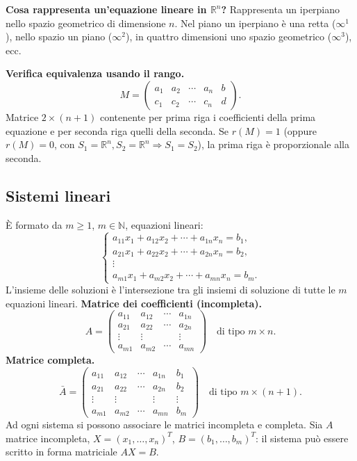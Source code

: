 \documentclass[11pt,a4paper]{article}
\newcommand{\pagina}[1]{\clearpage}
\begin{document}
\textbf{Cosa rappresenta un'equazione lineare in $\mathbb R^n$?} Rappresenta un iperpiano nello spazio geometrico
\pagina{23}
di dimensione $n$. Nel piano un iperpiano è una retta ($\infty^1$), nello spazio un piano ($\infty^2$), in quattro dimensioni uno spazio geometrico ($\infty^3$), ecc.

\textbf{Verifica equivalenza usando il rango.}
\[M=\begin{pmatrix}a_1&a_2&\cdots&a_n&b\\c_1&c_2&\cdots&c_n&d\end{pmatrix}.\]
Matrice $2\times(n+1)$ contenente per prima riga i coefficienti della prima equazione e per seconda riga quelli della seconda. Se $r(M)=1$ (oppure $r(M)=0$, con $S_1=\mathbb R^n,S_2=\mathbb R^n\Longrightarrow S_1=S_2$), la prima riga è proporzionale alla seconda.
\subsection*{Sistemi lineari}
È formato da $m\ge1$, $m\in\mathbb N$, equazioni lineari:
\[\begin{cases}a_{11}x_1+a_{12}x_2+\cdots+a_{1n}x_n=b_1,\\a_{21}x_1+a_{22}x_2+\cdots+a_{2n}x_n=b_2,\\\vdots\\a_{m1}x_1+a_{m2}x_2+\cdots+a_{mn}x_n=b_m.\end{cases}\]
L'insieme delle soluzioni è l'intersezione tra gli insiemi di soluzione di tutte le $m$ equazioni lineari.
\textbf{Matrice dei coefficienti (incompleta).}
\[A=\begin{pmatrix}a_{11}&a_{12}&\cdots&a_{1n}\\a_{21}&a_{22}&\cdots&a_{2n}\\\vdots&\vdots&&\vdots\\a_{m1}&a_{m2}&\cdots&a_{mn}\end{pmatrix}\quad\text{di tipo }m\times n.\]
\pagina{24}
\textbf{Matrice completa.}
\[\bar A=\begin{pmatrix}a_{11}&a_{12}&\cdots&a_{1n}&b_1\\a_{21}&a_{22}&\cdots&a_{2n}&b_2\\\vdots&\vdots&&\vdots&\vdots\\a_{m1}&a_{m2}&\cdots&a_{mn}&b_m\end{pmatrix}\quad\text{di tipo }m\times(n+1).\]
Ad ogni sistema si possono associare le matrici incompleta e completa. Sia $A$ matrice incompleta, $X=(x_1,\ldots,x_n)^T$, $B=(b_1,\ldots,b_m)^T$: il sistema può essere scritto in forma matriciale $AX=B$.
\end{document}
